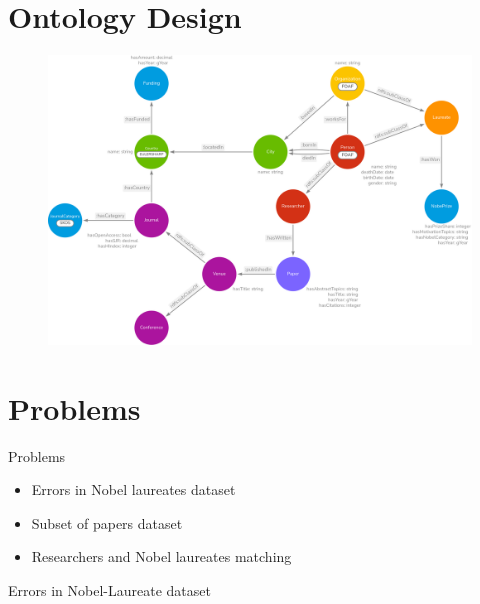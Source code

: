 \documentclass[aspectratio=169,xcolor=dvipsnames]{beamer}
\begin{document}
\section{Ontology Design}

\begin{frame}
	\begin{figure}
		\includegraphics[width=0.75\linewidth]{../nobelOntologyTransparent.png}
	\end{figure}
\end{frame}

\section{Problems}

\begin{frame}{Problems}
	\begin{itemize}
		\item Errors in Nobel laureates dataset
            \vspace{1em}
		\item Subset of papers dataset
            \vspace{1em}
		\item Researchers and Nobel laureates matching
	\end{itemize}
\end{frame}

\begin{frame}{Errors in Nobel-Laureate dataset}
	\begin{table}[H]
		\centering
		\caption{Example of dataset error}
		\label{tab:datasetError}
	\end{table}
\end{frame}
\end{document}
